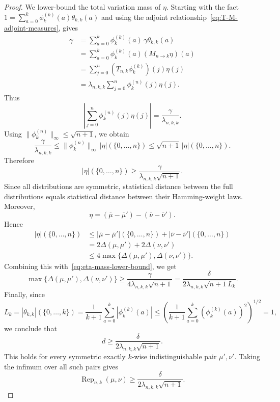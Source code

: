 \documentclass[10pt,a4paper]{amsart}
\begin{document}
\begin{proof}
We lower-bound the total variation mass of \(\eta\). Starting with the fact $1=\sum_{a=0}^k \phi_k^{(k)}(a)\theta_{k,k}(a)$ and using the
adjoint relationship~\eqref{eq:T-M-adjoint-measures}, gives
\[
\begin{aligned}
    \gamma
    &=
    \sum_{a=0}^k \phi_k^{(k)}(a)\,\gamma\theta_{k,k}(a)              \\
    &=
    \sum_{a=0}^k \phi_k^{(k)}(a)(M_{n\to k}\eta)(a)              \\
    &=
    \sum_{j=0}^n (T_{n,k}\phi_k^{(k)})(j)\eta(j)                 \\
    &=
    \lambda_{n,k,k}
    \sum_{j=0}^n \phi_k^{(n)}(j)\eta(j).
\end{aligned}
\]
Thus
\[
    \left|
        \sum_{j=0}^n \phi_k^{(n)}(j)\eta(j)
    \right|
    =
    \frac{\gamma}{\lambda_{n,k,k}}.
\]
Using $\|\phi_k^{(n)}\|_\infty\le \sqrt{n+1}$,
we obtain
\[
    \frac{\gamma}{\lambda_{n,k,k}}
    \le
    \|\phi_k^{(n)}\|_\infty\,|\eta|(\{0,\dots,n\})
    \le
    \sqrt{n+1}\,|\eta|(\{0,\dots,n\}).
\]
Therefore
\begin{equation}
\label{eq:eta-mass-lower-bound}
    |\eta|(\{0,\dots,n\})
    \ge
    \frac{\gamma}{\lambda_{n,k,k}\sqrt{n+1}}.
\end{equation}
Since all distributions are symmetric, statistical distance between the
full distributions equals statistical distance between their
Hamming-weight laws. Moreover,
\[
    \eta
    =
    (\overline{\mu}-\overline{\mu}')
    -
    (\overline{\nu}-\overline{\nu}').
\]
Hence
\[
\begin{aligned}
    |\eta|(\{0,\dots,n\})
    &\le
    |\overline{\mu}-\overline{\mu}'|(\{0,\dots,n\})
    +
    |\overline{\nu}-\overline{\nu}'|(\{0,\dots,n\})              \\
    &=
    2\Delta(\mu,\mu')
    +
    2\Delta(\nu,\nu')                                           \\
    &\le
    4\max\{\Delta(\mu,\mu'),\Delta(\nu,\nu')\}.
\end{aligned}
\]
Combining this with~\eqref{eq:eta-mass-lower-bound}, we get
\[
    \max\{\Delta(\mu,\mu'),\Delta(\nu,\nu')\}
    \ge
    \frac{\gamma}{4\lambda_{n,k,k}\sqrt{n+1}}
    =
    \frac{\delta}{2\lambda_{n,k,k}\sqrt{n+1}L_k}.
\]
Finally, since
\[
    L_k
    =
    |\theta_{k,k}|(\{0,\dots,k\})
    =
    \frac{1}{k+1}\sum_{a=0}^k |\phi_k^{(k)}(a)|
    \le
    \left(
        \frac{1}{k+1}\sum_{a=0}^k (\phi_k^{(k)}(a))^2
    \right)^{1/2}
    =
    1,
\]
we conclude that
\[
    d
    \ge
    \frac{\delta}{2\lambda_{n,k,k}\sqrt{n+1}}.
\]
This holds for every symmetric exactly \(k\)-wise indistinguishable pair
\(\mu',\nu'\). Taking the infimum over all such pairs gives
\[
    \operatorname{Rep}_{n,k}(\mu,\nu)
    \ge
    \frac{\delta}{2\lambda_{n,k,k}\sqrt{n+1}}.
\]
\end{proof}
\end{document}
